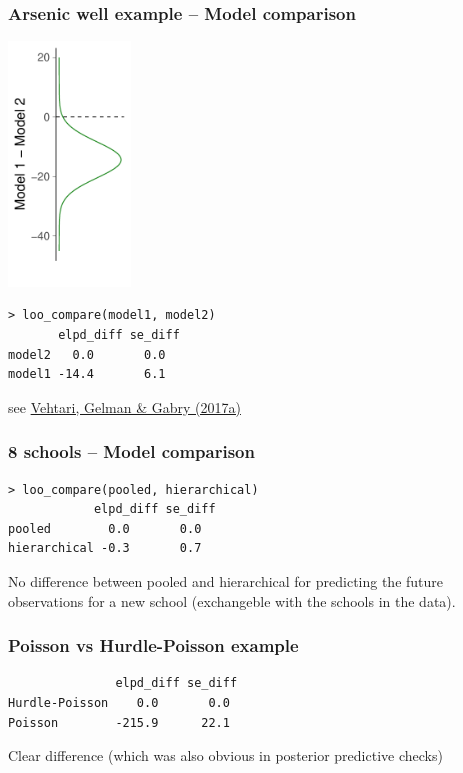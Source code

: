 \documentclass[english,t]{beamer}
\begin{document}
\begin{frame}[fragile]
  \frametitle{Arsenic well example -- Model comparison}

  {\includegraphics[height=6.5cm]{arsenicelpddiff_dens3.pdf}}
  \\
  {\scriptsize
\begin{lstlisting}
> loo_compare(model1, model2)
       elpd_diff se_diff
model2   0.0       0.0  
model1 -14.4       6.1  
\end{lstlisting}}
\vspace{-\baselineskip}
    {\scriptsize \hspace{6cm} see \href{http://link.springer.com/article/10.1007/s11222-016-9696-4}{Vehtari, Gelman \& Gabry (2017a)}}
    
\end{frame}

\begin{frame}[fragile]
  \frametitle{8 schools -- Model comparison}

  {\scriptsize
\begin{lstlisting}
> loo_compare(pooled, hierarchical)
            elpd_diff se_diff
pooled        0.0       0.0   
hierarchical -0.3       0.7   
\end{lstlisting}}

  No difference between pooled and hierarchical for predicting the
  future observations for a new school (exchangeble with the schools
  in the data).


\end{frame}

\begin{frame}[fragile]
  \frametitle{Poisson vs Hurdle-Poisson example}

  {\scriptsize
\begin{lstlisting}
               elpd_diff se_diff
Hurdle-Poisson    0.0       0.0 
Poisson        -215.9      22.1 
\end{lstlisting}}

Clear difference (which was also obvious in posterior predictive checks)

\end{frame}
\end{document}
